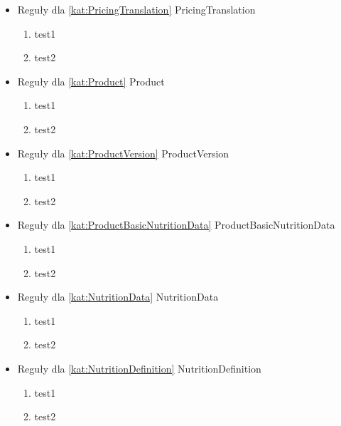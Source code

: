 \begin{itemize}[label={}]
    \item Reguły dla \ref{kat:PricingTranslation} PricingTranslation
    \begin{enumerate}[label={\textbf{REG/\protect\threedigits{\arabic{enumi}}}}, wide, labelwidth=!, resume]
        \item test1
        \item test2
    \end{enumerate}
    \item Reguły dla \ref{kat:Product} Product
    \begin{enumerate}[label={\textbf{REG/\protect\threedigits{\arabic{enumi}}}}, wide, labelwidth=!, resume]
        \item test1
        \item test2
    \end{enumerate}
    \item Reguły dla \ref{kat:ProductVersion} ProductVersion
    \begin{enumerate}[label={\textbf{REG/\protect\threedigits{\arabic{enumi}}}}, wide, labelwidth=!, resume]
        \item test1
        \item test2
    \end{enumerate}
    \item Reguły dla \ref{kat:ProductBasicNutritionData} ProductBasicNutritionData
    \begin{enumerate}[label={\textbf{REG/\protect\threedigits{\arabic{enumi}}}}, wide, labelwidth=!, resume]
        \item test1
        \item test2
    \end{enumerate}
    \item Reguły dla \ref{kat:NutritionData} NutritionData
    \begin{enumerate}[label={\textbf{REG/\protect\threedigits{\arabic{enumi}}}}, wide, labelwidth=!, resume]
        \item test1
        \item test2
    \end{enumerate}
    \item Reguły dla \ref{kat:NutritionDefinition} NutritionDefinition
    \begin{enumerate}[label={\textbf{REG/\protect\threedigits{\arabic{enumi}}}}, wide, labelwidth=!, resume]
        \item test1
        \item test2
    \end{enumerate}

\end{itemize}

